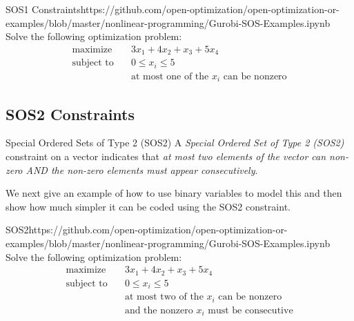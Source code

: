 \begin{examplewithcode}{SOS1 Constraints}{https://github.com/open-optimization/open-optimization-or-examples/blob/master/nonlinear-programming/Gurobi-SOS-Examples.ipynb}
\label{example:sos1}
Solve the following optimization problem: \[\begin{aligned}
\text{maximize}\quad & 3x_1 + 4x_2 + x_3 + 5x_4 \\
\text{subject to}\quad & 0 \le x_i \le 5 \\
& \text{at most one of the $x_i$ can be nonzero}
\end{aligned}\]
\end{examplewithcode}
\subsection{SOS2 Constraints}
\begin{definition}{Special Ordered Sets of Type 2 (SOS2)}{}
A \emph{Special Ordered Set of Type 2 (SOS2)} constraint on a vector indicates that \emph{at most two elements of the vector can non-zero AND the non-zero elements must appear consecutively}.
\end{definition}
We next give an example of how to use binary variables to model this and then show how much simpler it can be coded using the SOS2 constraint.
\begin{examplewithcode}{SOS2}{https://github.com/open-optimization/open-optimization-or-examples/blob/master/nonlinear-programming/Gurobi-SOS-Examples.ipynb}
\label{example:SOS2}
Solve the following optimization problem: \[\begin{aligned}
\text{maximize}\quad & 3x_1 + 4x_2 + x_3 + 5x_4 \\
\text{subject to}\quad & 0 \le x_i \le 5 \\
& \text{at most two of the $x_i$ can be nonzero} \\
& \text{and the nonzero $x_i$ must be consecutive}
\end{aligned}\]
\end{examplewithcode}


